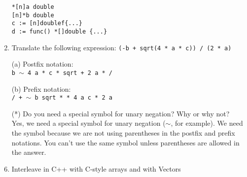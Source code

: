 \documentclass{article}
\begin{document}
\begin{enumerate}
\begin{verbatim}
*[n]a double
[n]*b double
c := [n]doublef{...}
d := func() *[]double {...}
\end{verbatim}
\pagebreak
\item Translate the following expression: \texttt{(-b + sqrt(4 * a * c)) / (2 * a)}
    \item[(a)]Postfix notation: \\\texttt{b \(\sim\) 4 a * c * sqrt + 2 a * /} \\
    \item[(b)]Prefix notation: \\\texttt{/ + \(\sim\) b sqrt * * 4 a c * 2 a} \\ 
    \item[(*)] Do you need a special symbol for unary negation? Why or why not? \\
    Yes, we need a special symbol for unary negation (\(\sim\), for example). We need the symbol because we are not using parentheses in the postfix and prefix notations. You can't use the same symbol unless parentheses are allowed in the answer.
\pagebreak
\item Interleave in C++ with C-style arrays and with Vectors

\pagebreak
\end{enumerate}
\end{document}
